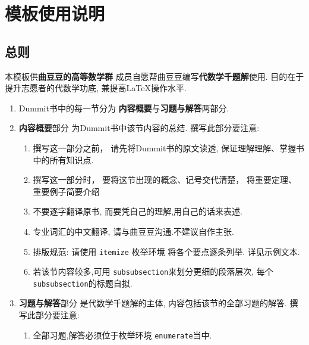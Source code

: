 \documentclass[oneside,a4papar,11pt,UTF8]{book}
\begin{document}
\tableofcontents
\newpage

\chapter{模板使用说明}

\section{总则}

本模板供\textbf{曲豆豆的高等数学群}
成员自愿帮曲豆豆编写\textbf{代数学千题解}使用.
目的在于提升志愿者的代数学功底,
兼提高\LaTeX 操作水平.

\begin{enumerate}
  \item Dummit书中的每一节分为
  \textbf{内容概要}与\textbf{习题与解答}两部分.
  
  \item \textbf{内容概要}部分
  为Dummit书中该节内容的总结.
  撰写此部分要注意:
  \begin{enumerate}
    \item 撰写这一部分之前，
    请先将Dummit书的原文读透,
    保证理解理解、掌握书中的所有知识点.
    
    \item 撰写这一部分时，
    要将这节出现的概念、记号交代清楚，
    将重要定理、重要例子简要介绍
     
    \item 不要逐字翻译原书,
    而要凭自己的理解,用自己的话来表述.
    
    \item 专业词汇的中文翻译,
    请与曲豆豆沟通.不建议自作主张. 
    
    \item 排版规范: 请使用
    \verb"itemize" 枚举环境
    将各个要点逐条列举.
    详见示例文本.
    
    \item 若该节内容较多,可用
    \verb"subsubsection"来划分更细的段落层次,
    每个\verb"subsubsection"的标题自拟.
  \end{enumerate}
  
  \item \textbf{习题与解答}部分
  是代数学千题解的主体,
  内容包括该节的全部习题的解答.
  撰写此部分要注意:
  \begin{enumerate}
    \item 全部习题,解答必须位于枚举环境
    \verb"enumerate"当中.
    

\end{enumerate}
\end{enumerate}
\end{document}
